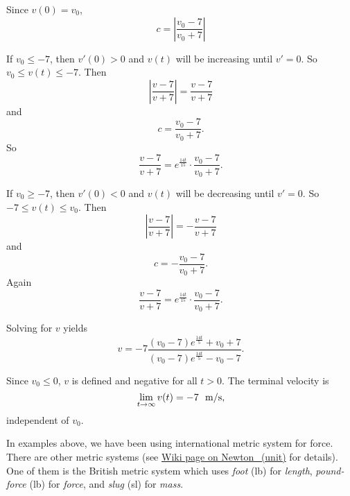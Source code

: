 \begin{solution}
Since $v(0)=v_0$, 
\[c=\left|\frac{v_0-7}{v_0+7}\right|\]

If $v_0\le -7$, then $v'(0)>0$ and $v(t)$ will be increasing until $v'=0$. So $v_0\le v(t)\le-7$. Then
\[\left|\frac{v-7}{v+7}\right|=\frac{v-7}{v+7}\]
and 
\[c=\frac{v_0-7}{v_0+7}.\]
So 
\[\frac{v-7}{v+7}=e^{\frac{14t}{15}}\cdot \frac{v_0-7}{v_0+7}.\]

If $v_0\ge -7$, then $v'(0)<0$ and $v(t)$ will be decreasing until $v'=0$. So $-7\le v(t)\le v_0$. Then
\[\left|\frac{v-7}{v+7}\right|=-\frac{v-7}{v+7}\]
and 
\[c=-\frac{v_0-7}{v_0+7}.\]
Again
\[\frac{v-7}{v+7}=e^{\frac{14t}{15}}\cdot \frac{v_0-7}{v_0+7}.\]

Solving for $v$ yields
\[v=-7\frac{(v_0-7)e^{\frac{14t}{5}}+v_0+7}{(v_0-7)e^{\frac{14t}{5}}-v_0-7}.\]

Since $v_0\le 0$, $v$ is defined and negative for all $t>0$. The terminal velocity is
\[\lim_{t\to\infty} v(t)=-7~\textup{ m/s},\]
independent of $v_0$.
\end{solution}

In examples above, we have been using international metric system for force. 
There are other metric systems (see \href{https://en.wikipedia.org/wiki/Newton\_(unit)}{Wiki page on Newton\_(unit)} for details). 
One of them is the British metric system which uses \emph{foot} (lb) for \emph{length}, \emph{pound-force} (lb) for \emph{force}, and \emph{slug} (sl) for \emph{mass}. 

